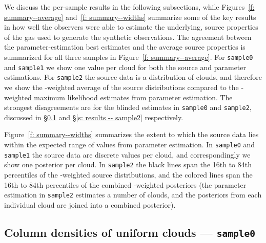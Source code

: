 \documentclass[fleqn,usenatbib]{mnras}
\begin{document}
We discuss the per-sample results in the following subsections,
while Figures~\ref{f: summary--average} and~\ref{f: summary--widths} summarize some of the key results in how well the observers were able to estimate the underlying, source properties of the gas used to generate the synthetic observations.
The agreement between the parameter-estimation best estimates and the average source properties is summarized for all three samples in Figure~\ref{f: summary--average}.
For \texttt{sample0} and \texttt{sample1} we show one value per cloud for both the source and parameter estimations.
For \texttt{sample2} the source data is a distribution of clouds, and therefore we show the -weighted average of the source distributions compared to the -weighted maximum likelihood estimates from parameter estimation.
The strongest disagreements are for the blinded estimates in \texttt{sample0} and \texttt{sample2}, discussed in \S\ref{s: results -- sample0} and \S\ref{s: results -- sample2} respectively.

Figure~\ref{f: summary--widths} summarizes the extent to which the source data lies within the expected range of values from parameter estimation.
In \texttt{sample0} and \texttt{sample1} the source data are discrete values per cloud,
and correspondingly we show one posterior per cloud.
In \texttt{sample2} the black lines span the 16th to 84th percentiles of the -weighted source distributions,
and the colored lines span the 16th to 84th percentiles of the combined -weighted posteriors (the parameter estimation in \texttt{sample2} estimates a number of clouds, and the posteriors from each individual cloud are joined into a combined posterior).

\subsection{Column densities of uniform clouds --- \texttt{sample0}}
\label{s: results -- sample0}
\end{document}
